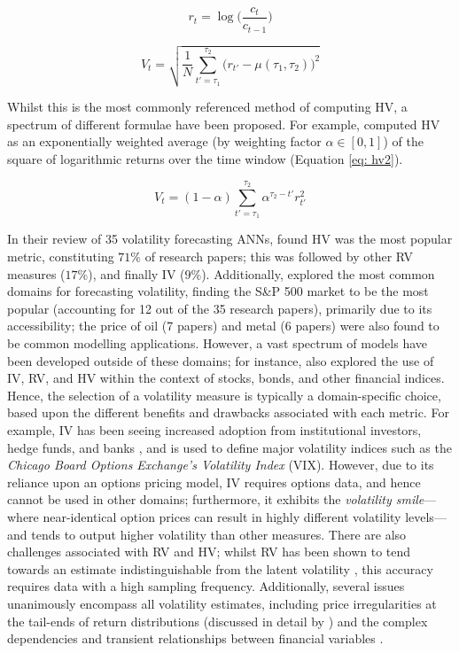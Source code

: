 \documentclass[a4paper, 11pt]{report}
\begin{document}
    \begin{equation}
        \label{eq: return}
        r_t = \log\Big(\frac{c_t}{c_{t-1}}\Big)
    \end{equation}

    \begin{equation}
        \label{eq: hv1}
        V_t = \sqrt{ \frac{1}{N} \sum_{t' = \tau_1}^{\tau_2} \big( r_{t'} - \mu(\tau_1, \tau_2) \big)^2 }
    \end{equation}

    Whilst this is the most commonly referenced method of computing HV, a spectrum of different formulae have been proposed. For example, \citet{tino-2001} computed HV as an exponentially weighted average (by weighting factor $\alpha \in [0, 1]$) of the square of logarithmic returns over the time window (Equation \ref{eq: hv2}). 

    \begin{equation}
        \label{eq: hv2}
        V_t = (1 - \alpha) \sum_{t' = \tau_1}^{\tau_2} \alpha^{\tau_2 - t'} r_{t'}^2
    \end{equation}

    In their review of 35 volatility forecasting ANNs, \citet{ge-2022} found HV was the most popular metric, constituting $71\%$ of research papers; this was followed by other RV measures ($17\%$), and finally IV ($9\%$). Additionally, \citet{ge-2022} explored the most common domains for forecasting volatility, finding the S\&P 500 market to be the most popular (accounting for 12 out of the 35 research papers), primarily due to its accessibility; the price of oil (7 papers) and metal (6 papers) were also found to be common modelling applications. However, a vast spectrum of models have been developed outside of these domains; for instance, \citet{ge-2022} also explored the use of IV, RV, and HV within the context of stocks, bonds, and other financial indices. Hence, the selection of a volatility measure is typically a domain-specific choice, based upon the different benefits and drawbacks associated with each metric. For example, IV has been seeing increased adoption from institutional investors, hedge funds, and banks \citep{neftci-2008}, and is used to define major volatility indices such as the \emph{Chicago Board Options Exchange's Volatility Index} (VIX). However, due to its reliance upon an options pricing model, IV requires options data, and hence cannot be used in other domains; furthermore, it exhibits the \emph{volatility smile}---where near-identical option prices can result in highly different volatility levels---and tends to output higher volatility than other measures. There are also challenges associated with RV and HV; whilst RV has been shown to tend towards an estimate indistinguishable from the latent volatility \citep{andersen-2001}, this accuracy requires data with a high sampling frequency. Additionally, several issues unanimously encompass all volatility estimates, including price irregularities at the tail-ends of return distributions (discussed in detail by \citet{ozbayoglu-2020}) and the complex dependencies and transient relationships between financial variables \citep{timmermann-2004}.
\end{document}
